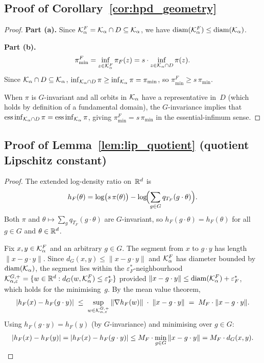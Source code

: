 \subsection{Proof of Corollary~\ref{cor:hpd_geometry}}
\label{app:proof_hpd_cor}

\begin{proof}
  \textbf{Part (a).}
  Since $\mathcal{K}_\alpha^F = \mathcal{K}_\alpha \cap D \subseteq \mathcal{K}_\alpha$,
  we have $\mathrm{diam}(\mathcal{K}_\alpha^F) \leq \mathrm{diam}(\mathcal{K}_\alpha)$.

  \textbf{Part (b).}
  \[
    \pi_{\min}^F
    = \inf_{z \in \mathcal{K}_\alpha^F} \pi_F(z)
    = s \cdot \inf_{z \in \mathcal{K}_\alpha \cap D} \pi(z).
  \]
  Since $\mathcal{K}_\alpha \cap D \subseteq \mathcal{K}_\alpha$,
  $\inf_{\mathcal{K}_\alpha \cap D} \pi \geq \inf_{\mathcal{K}_\alpha} \pi
  = \pi_{\min}$,
  so $\pi_{\min}^F \geq s\,\pi_{\min}$.

  When $\pi$ is $G$-invariant and all orbits in $\mathcal{K}_\alpha$
  have a representative in~$D$ (which holds by definition of a
  fundamental domain), the $G$-invariance implies that
  $\operatorname{ess\,inf}_{\mathcal{K}_\alpha \cap D} \pi
  = \operatorname{ess\,inf}_{\mathcal{K}_\alpha} \pi$,
  giving $\pi_{\min}^F = s\,\pi_{\min}$ in the essential-infimum
  sense.
\end{proof}


\subsection{Proof of Lemma~\ref{lem:lip_quotient}
  (quotient Lipschitz constant)}
\label{app:proof_lip}

\begin{proof}
  The extended log-density ratio on~$\mathbb{R}^d$ is
  \[
    h_F(\theta)
    = \log\bigl(s\,\pi(\theta)\bigr)
    - \log\!\Bigl(\sum_{g \in G} q_{T_F}(g \cdot \theta)\Bigr).
  \]
  Both $\pi$ and $\theta \mapsto \sum_g q_{T_F}(g \cdot \theta)$
  are $G$-invariant, so $h_F(g \cdot \theta) = h_F(\theta)$ for
  all $g \in G$ and $\theta \in \mathbb{R}^d$.

  Fix $x, y \in \mathcal{K}_\alpha^F$ and an arbitrary $g \in G$.
  The segment from $x$ to $g \cdot y$ has length
  $\|x - g \cdot y\|$.  Since $d_G(x, y) \leq \|x - g \cdot y\|$
  and $\mathcal{K}_\alpha^F$ has diameter bounded by
  $\mathrm{diam}(\mathcal{K}_\alpha)$, the segment lies within the
  $\varepsilon_F^*$-neighbourhood
  $\mathcal{K}_{\alpha,\varepsilon}^{G,+}
  = \{w \in \mathbb{R}^d : d_G(w, \mathcal{K}_\alpha^F) \leq \varepsilon_F^*\}$
  provided $\|x - g \cdot y\| \leq \mathrm{diam}(\mathcal{K}_\alpha^F)
  + \varepsilon_F^*$, which holds for the minimising~$g$.
  By the mean value theorem,
  \[
    |h_F(x) - h_F(g \cdot y)|
    \;\leq\;
    \sup_{w \in \mathcal{K}_{\alpha,\varepsilon}^{G,+}}
    \|\nabla h_F(w)\|
    \;\cdot\;
    \|x - g \cdot y\|
    \;=\;
    M_F \cdot \|x - g \cdot y\|.
  \]
  Using $h_F(g \cdot y) = h_F(y)$ (by $G$-invariance) and
  minimising over $g \in G$:
  \[
    |h_F(x) - h_F(y)|
    = |h_F(x) - h_F(g \cdot y)|
    \leq M_F \cdot \min_{g \in G}\|x - g \cdot y\|
    = M_F \cdot d_G(x, y).
    \qedhere
  \]
\end{proof}


